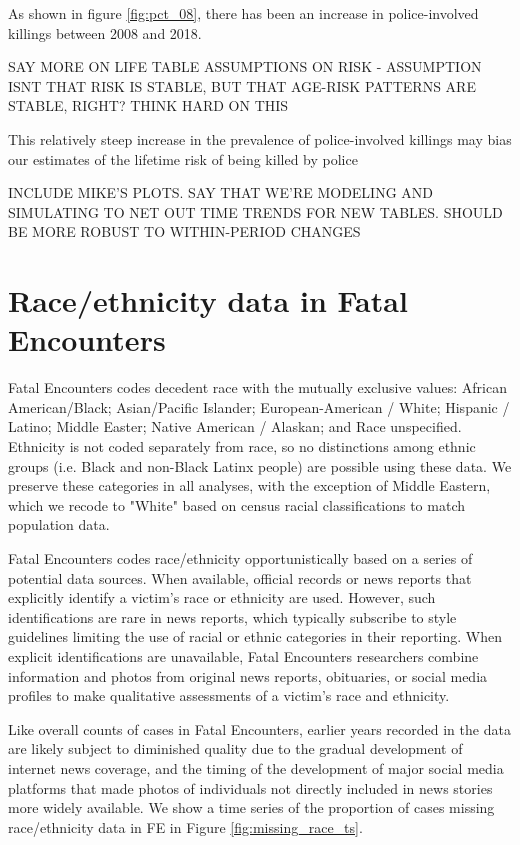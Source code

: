 \documentclass{article}
\begin{document}
As shown in figure \ref{fig:pct_08}, there has been an increase in police-involved killings between 2008 and 2018. 

SAY MORE ON LIFE TABLE ASSUMPTIONS ON RISK - ASSUMPTION ISNT THAT RISK IS STABLE, BUT THAT AGE-RISK PATTERNS ARE STABLE, RIGHT? THINK HARD ON THIS

This relatively steep increase in the prevalence of police-involved killings may bias our estimates of the lifetime risk of being killed by police

INCLUDE MIKE'S PLOTS. SAY THAT WE'RE MODELING AND SIMULATING TO NET OUT TIME TRENDS FOR NEW TABLES. SHOULD BE MORE ROBUST TO WITHIN-PERIOD CHANGES

\section{Race/ethnicity data in Fatal Encounters}

Fatal Encounters codes decedent race with the mutually exclusive values: African American/Black; Asian/Pacific Islander; European-American / White; Hispanic / Latino; Middle Easter; Native American / Alaskan; and Race unspecified. Ethnicity is not coded separately from race, so no distinctions among ethnic groups (i.e. Black and non-Black Latinx people) are possible using these data. We preserve these categories in all analyses, with the exception of Middle Eastern, which we recode to "White" based on census racial classifications to match population data. 

Fatal Encounters codes race/ethnicity opportunistically based on a series of potential data sources. When available, official records or news reports that explicitly identify a victim's race or ethnicity are used. However, such identifications are rare in news reports, which typically subscribe to style guidelines limiting the use of racial or ethnic categories in their reporting. When explicit identifications are unavailable, Fatal Encounters researchers combine information and photos from original news reports, obituaries, or social media profiles to make qualitative assessments of a victim's race and ethnicity. 

Like overall counts of cases in Fatal Encounters, earlier years recorded in the data are likely subject to diminished quality due to the gradual development of internet news coverage, and the timing of the development of major social media platforms that made photos of individuals not directly included in news stories more widely available. We show a time series of the proportion of cases missing race/ethnicity data in FE in Figure \ref{fig:missing_race_ts}.
\end{document}
